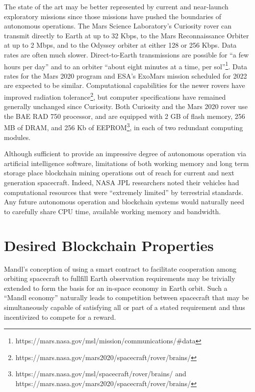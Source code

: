 \documentclass[journal ]{new-aiaa}
\begin{document}
The state of the art may be better represented by current and near-launch exploratory missions since those missions have pushed the boundaries of autonomous operations. The Mars Science Laboratory's Curiosity rover can transmit directly to Earth at up to 32 Kbps, to the Mars Reconnaissance Orbiter at up to 2 Mbps, and to the Odyssey orbiter at either 128 or 256 Kbps. Data rates are often much slower. Direct-to-Earth transmissions are possible for ``a few hours per day'' and to an orbiter ``about eight minutes at a time, per sol''\footnote{https://mars.nasa.gov/msl/mission/communications/\#data}. Data rates for the Mars 2020 program and ESA's ExoMars mission scheduled for 2022 are expected to be similar. Computational capabilities for the newer rovers have improved radiation tolerance\footnote{https://mars.nasa.gov/mars2020/spacecraft/rover/brains/}, but computer specifications have remained generally unchanged since Curiosity. Both Curiosity and the Mars 2020 rover use the BAE RAD 750 processor, and are equipped with 2 GB of flash memory, 256 MB of DRAM, and 256 Kb of EEPROM\footnote{https://mars.nasa.gov/msl/spacecraft/rover/brains/ and https://mars.nasa.gov/mars2020/spacecraft/rover/brains/}, in each of two redundant computing modules.

Although sufficient to provide an impressive degree of autonomous operation via artificial intelligence software\cite{bajracharya2008autonomy}, limitations of both working memory and long term storage place blockchain mining operations out of reach for current and next generation spacecraft. Indeed, NASA JPL researchers noted their vehicles had computational resources that were ``extremely limited'' by terrestrial standards\cite{bajracharya2008autonomy}. Any future autonomous operation and blockchain systems would naturally need to carefully share CPU time, available working memory and bandwidth.

\section{Desired Blockchain Properties}\label{sec:desiredproperties}

Mandl's conception of using a smart contract to facilitate cooperation among orbiting spacecraft to fullfill Earth observation requirements may be trivially extended to form the basis for an in-space economy in Earth orbit. Such a ``Mandl economy'' naturally leads to competition between spacecraft that may be simultaneously capable of satisfying all or part of a stated requirement and thus incentivized to compete for a reward.
\end{document}
